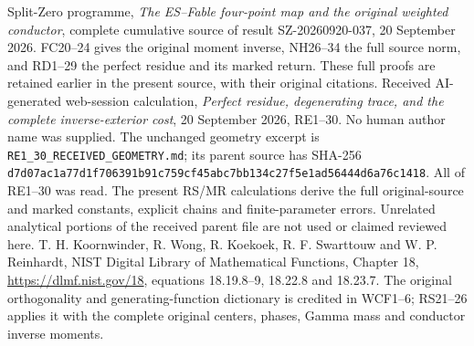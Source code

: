 
 Split-Zero programme,
\emph{The ES--Fable four-point map and the original weighted conductor},
complete cumulative source of result SZ-20260920-037, 20 September 2026.
FC20--24 gives the original moment inverse, NH26--34 the full source norm,
and RD1--29 the perfect residue and its marked return. These full proofs
are retained earlier in the present source, with their original citations.
 Received AI-generated web-session calculation,
\emph{Perfect residue, degenerating trace, and the complete
inverse-exterior cost}, 20 September 2026, RE1--30.
No human author name was supplied. The unchanged geometry excerpt is
\texttt{RE1\_30\_RECEIVED\_GEOMETRY.md}; its parent source has SHA-256
\texttt{d7d07ac1a77d1f706391b91c759cf45abc7bb134c27f5e1ad56444d6a76c1418}.
All of RE1--30 was read. The present RS/MR calculations derive the full
original-source and marked constants, explicit chains and finite-parameter
errors. Unrelated analytical portions of the received parent file are not
used or claimed reviewed here.
 T. H. Koornwinder, R. Wong, R. Koekoek,
R. F. Swarttouw and W. P. Reinhardt,
NIST Digital Library of Mathematical Functions, Chapter 18,
\url{https://dlmf.nist.gov/18}, equations 18.19.8--9,
18.22.8 and 18.23.7. The original orthogonality and generating-function
dictionary is credited in WCF1--6; RS21--26 applies it with the complete
original centers, phases, Gamma mass and conductor inverse moments.
